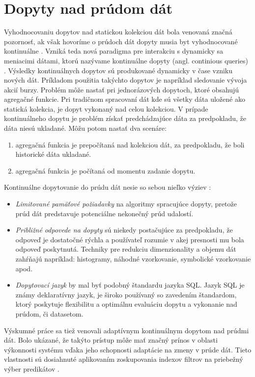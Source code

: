 \section{Dopyty nad prúdom dát}
Vyhodnocovaniu dopytov nad statickou kolekciou dát bola venovaná značná pozornosť, ak však hovoríme o prúdoch dát dopyty musia byt vyhodnocované kontinuálne \citep{babu2001continuous, babcock2002models}. Vzniká teda nová paradigma pre interakciu s dynamicky sa meniacimi dátami, ktorú nazývame kontinuálne dopyty (angl. continious queries) \citep{babu2001continuous}. Výsledky kontinuálnych dopytov sú produkované dynamicky v čase vzniku nových dát. Príkladom použitia takýchto dopytov je napríklad sledovanie vývoja akcií burzy. Problém môže nastať pri jednorázových dopytoch, ktoré obsahujú agregačné funkcie. Pri tradičnom spracovaní dát kde sú všetky dáta uložené ako statická kolekcia, je dopyt vykonaný nad celou kolekciou. V prípade kontinuálneho dopytu je problém získať predchádzajúce dáta za predpokladu, že dáta niesú ukladané. Môžu potom nastať dva scenáre:
\begin{enumerate}
	\item agregačná funkcia je prepočítaná nad kolekciou dát, za predpokladu, že boli historické dáta ukladané.
	\item agregačná funkcia je počítaná od momentu zadanie dopytu.
\end{enumerate}
Kontinuálne dopytovanie do prúdu dát nesie so sebou nieľko výziev \citep{babcock2002models}:
\begin{itemize}
	\item \textit{Limitované pamäťové požiadavky} na algoritmy spracujúce dopyty, pretože prúd dát predstavuje potenciálne nekonečný prúd udalostí.
	\item \textit{Približné odpovede na dopyty} sú niekedy postačujúce za predpokladu, že odpoveď je dostatočné rýchla a používateľ rozumie v akej presnosti mu bola odpoveď poskytnutá. Techniky pre redukciu dimenzionality a objemu dát zahŕňajú napríklad: histogramy, náhodné vzorkovanie, symbolické vzorkovanie apod.
	\item \textit{Dopytovací jazyk} by mal byť podobný štandardu jazyka SQL. Jazyk SQL je známy deklaratívny jazyk, je široko používaný so zavedením štandardom, ktorý poskytuje flexibilitu a optimálnu evaluáciu dopytu a vykonanie nad prúdom, či datasetom. 
\end{itemize}
Výskumné práce sa tiež venovali adaptívnym kontinuálnym dopytom nad prúdmi dát. Bolo ukázané, že takýto prístup môže mať značný prínos v oblasti výkonnosti systému vďaka jeho schopnosti adaptácie na zmeny v prúde dát. Tieto vlastnosti sú dosiahnuté aplikovaním zoskupovania indexov filtrov na priebežný výber predikátov \citep{madden2002continuously}. \par
